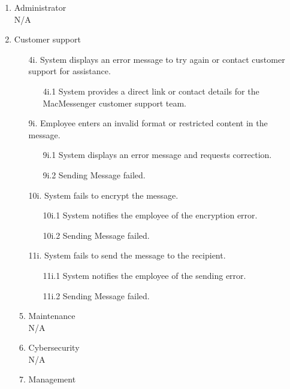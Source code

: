 \documentclass[]{article}
\begin{document}
\begin{enumerate}[{\bf BE1.}]
\begin{enumerate}[{\bf VP1.}]
\begin{enumerate}
                \end{enumerate}
		  \item Administrator \\
				N/A
            \item Customer support \\
            \begin{enumerate}
                \item[4i.] System displays an error message to try again or contact customer support for assistance.
                \begin{enumerate}
                    \item[4i.1] System provides a direct link or contact details for the MacMessenger customer support team.
                \end{enumerate}
                \item[9i.] Employee enters an invalid format or restricted content in the message.
                \begin{enumerate}
                    \item[9i.1] System displays an error message and requests correction.
                    \item[9i.2] Sending Message failed.
                \end{enumerate}
                \item[10i.] System fails to encrypt the message.
                \begin{enumerate}
                    \item[10i.1] System notifies the employee of the encryption error.
                    \item[10i.2] Sending Message failed.
                \end{enumerate}
                \item[11i.] System fails to send the message to the recipient.
                \begin{enumerate}
                    \item[11i.1] System notifies the employee of the sending error.
                    \item[11i.2] Sending Message failed.
                \end{enumerate}
            \item Maintenance \\
            N/A
            \item Cybersecurity \\
            N/A
            \item Management \\

\end{enumerate}
\end{enumerate}
\end{enumerate}
\end{document}
